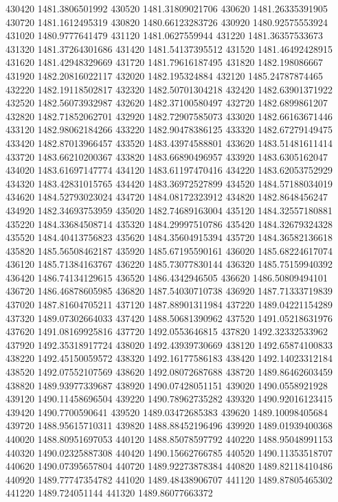 {430420 1481.3806501992
430520 1481.31809021706
430620 1481.26335391905
430720 1481.1612495319
430820 1480.66123283726
430920 1480.92575553924
431020 1480.9777641479
431120 1481.0627559944
431220 1481.36357533673
431320 1481.37264301686
431420 1481.54137395512
431520 1481.46492428915
431620 1481.42948329669
431720 1481.79616187495
431820 1482.198086667
431920 1482.20816022117
432020 1482.195324884
432120 1485.24787874465
432220 1482.19118502817
432320 1482.50701304218
432420 1482.63901371922
432520 1482.56073932987
432620 1482.37100580497
432720 1482.6899861207
432820 1482.71852062701
432920 1482.72907585073
433020 1482.66163671446
433120 1482.98062184266
433220 1482.90478386125
433320 1482.67279149475
433420 1482.87013966457
433520 1483.43974588801
433620 1483.51481611414
433720 1483.66210200367
433820 1483.66890496957
433920 1483.6305162047
434020 1483.61697147774
434120 1483.61197470416
434220 1483.62053752929
434320 1483.42831015765
434420 1483.36972527899
434520 1484.57188034019
434620 1484.52793023024
434720 1484.08172323912
434820 1482.8648456247
434920 1482.34693753959
435020 1482.74689163004
435120 1484.32557180881
435220 1484.33684508714
435320 1484.29997510786
435420 1484.32679324328
435520 1484.40413756823
435620 1484.35604915394
435720 1484.36582136618
435820 1485.56508462187
435920 1485.67195590161
436020 1485.68224617074
436120 1485.71384163767
436220 1485.73077830144
436320 1485.75159940392
436420 1486.74134129615
436520 1486.4342946505
436620 1486.50809494101
436720 1486.46878605985
436820 1487.54030710738
436920 1487.71333719839
437020 1487.81604705211
437120 1487.88901311984
437220 1489.04221154289
437320 1489.07302664033
437420 1488.50681390962
437520 1491.05218631976
437620 1491.08169925816
437720 1492.0553646815
437820 1492.32332533962
437920 1492.35318917724
438020 1492.43939730669
438120 1492.65874100833
438220 1492.45150059572
438320 1492.16177586183
438420 1492.14023312184
438520 1492.07552107569
438620 1492.08072687688
438720 1489.86462603459
438820 1489.93977339687
438920 1490.07428051151
439020 1490.0558921928
439120 1490.11458696504
439220 1490.78962735282
439320 1490.92016123415
439420 1490.7700590641
439520 1489.03472685383
439620 1489.10098405684
439720 1488.95615710311
439820 1488.88452196496
439920 1489.01939400368
440020 1488.80951697053
440120 1488.85078597792
440220 1488.95048991153
440320 1490.02325887308
440420 1490.15662766785
440520 1490.11353518707
440620 1490.07395657804
440720 1489.92273878384
440820 1489.82118410486
440920 1489.77747354782
441020 1489.48438906707
441120 1489.87805465302
441220 1489.724051144
441320 1489.86077663372
}
